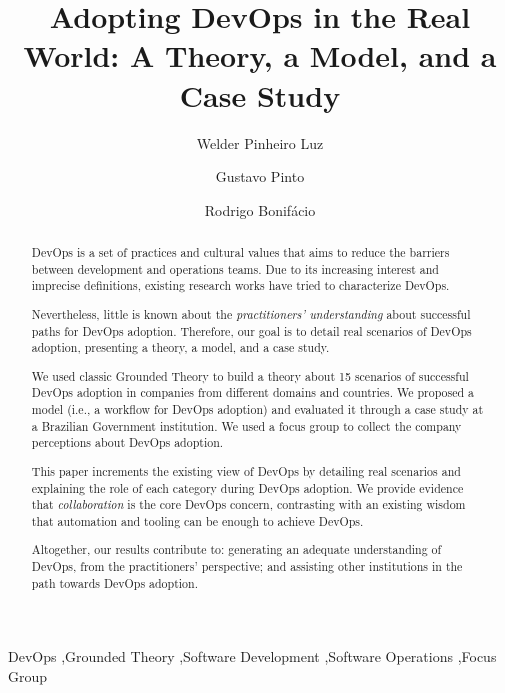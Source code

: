 \documentclass[preprint,12pt,3p]{elsarticle}
\begin{document}
\begin{frontmatter}

\title{Adopting DevOps in the Real World: A Theory, a Model, and a Case Study}

\author[label1]{Welder Pinheiro Luz}
\address[label1]{Brazilian Federal Court of Accounts}

\author[label2]{Gustavo Pinto}
\address[label2]{Federal University of Par\'a}

\author[label3]{Rodrigo Bonif\'acio}
\address[label3]{University of Bras\'{i}lia}

\begin{abstract}

DevOps is a set of practices and cultural values
that aims to reduce the
barriers between development and operations
teams. Due to its increasing interest and imprecise
definitions, existing research works have tried to
characterize DevOps.

Nevertheless, little is
known about the \emph{practitioners' understanding}
about successful paths for DevOps adoption. Therefore, our goal is to detail
real scenarios of DevOps adoption, presenting a theory, a model, and a case study.

We used classic Grounded Theory to build a theory about 15
scenarios of successful DevOps adoption in companies from different
domains and countries. We proposed a model (i.e., a workflow for DevOps
adoption) and evaluated it through
a case study at a Brazilian Government institution. We used a focus group to
collect the company perceptions about DevOps adoption.

This paper increments the existing view of
DevOps by detailing real scenarios and explaining the role of each
category during DevOps adoption.
We provide evidence that \emph{collaboration} is the core DevOps concern,
contrasting with an existing wisdom that automation and tooling can be enough
to achieve DevOps.

Altogether, our results contribute to: generating
an adequate understanding of DevOps, from the practitioners' perspective; and
assisting other institutions in the path towards DevOps adoption.

\end{abstract}

\begin{keyword}
DevOps \sep Grounded Theory \sep Software Development \sep Software Operations \sep Focus Group
\end{keyword}

\end{frontmatter}
























\end{document}
